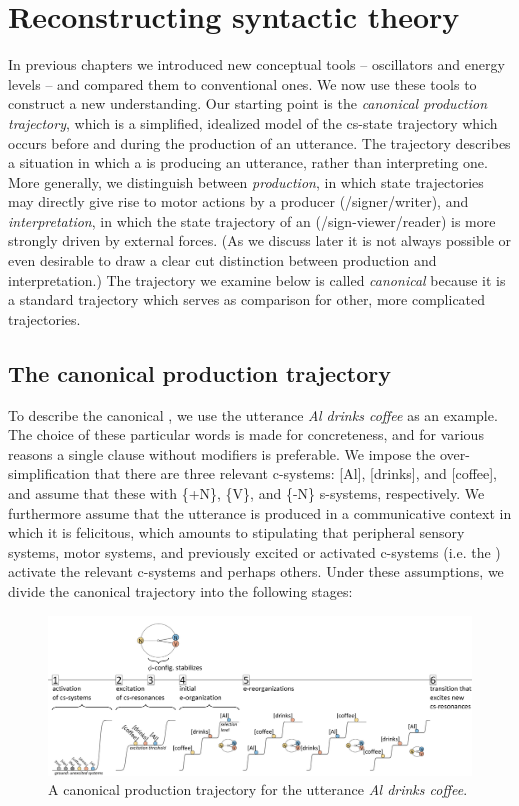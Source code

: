 \chapter{Reconstructing syntactic theory}

In previous chapters we introduced new conceptual tools -- oscillators and energy levels -- and compared them to conventional ones. We now use these tools to construct a new understanding. Our starting point is the \textit{canonical production trajectory}, which is a simplified, idealized model of the cs-state trajectory which occurs before and during the production of an utterance. The trajectory describes a situation in which a  is producing an utterance, rather than interpreting one. More generally, we distinguish between \textit{production}, in which state trajectories may directly give rise to motor actions by a producer (/signer/writer), and \textit{interpretation}, in which the state trajectory of an  (/sign-viewer/reader) is more strongly driven by external forces. (As we discuss later it is not always possible or even desirable to draw a clear cut distinction between production and interpretation.) The trajectory we examine below is called \textit{canonical} because it is a standard trajectory which serves as comparison for other, more complicated trajectories.

\section{The canonical production trajectory}

To describe the canonical , we use the utterance \textit{Al drinks coffee} as an example. The choice of these particular words is made for concreteness, and for various reasons a single clause without modifiers is preferable. We impose the over-simplification that there are three relevant c-systems: [Al], [drinks], and [coffee], and assume that these  with \{+N\}, \{V\}, and \{-N\} s-systems, respectively. We furthermore assume that the utterance is produced in a communicative context in which it is felicitous, which amounts to stipulating that peripheral sensory systems, motor systems, and previously excited or activated c-systems (i.e. the ) activate the relevant c-systems and perhaps others. Under these assumptions, we divide the canonical trajectory into the following stages:

  
\begin{figure}
\includegraphics[width=\textwidth]{figures/Tilsen-img51.png}
\caption{A canonical production trajectory for the utterance \textit{Al drinks coffee}.}
\label{fig:4:1}
\end{figure}
 

